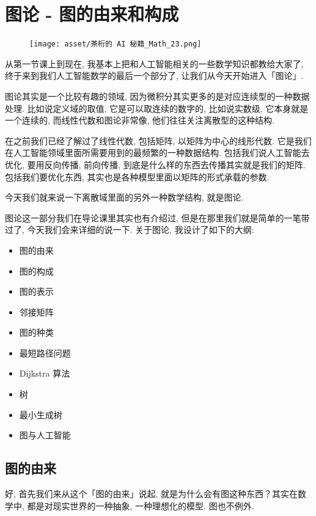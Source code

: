 \chapter{图论 - 图的由来和构成}

\begin{figure}[ht]
  \centering
  \texttt{[image: asset/茶桁的 AI 秘籍\_Math\_23.png]}
\end{figure}

\newpage

从第一节课上到现在, 我基本上把和人工智能相关的一些数学知识都教给大家了, 终于来到我们人工智能数学的最后一个部分了, 让我们从今天开始进入「图论」. 

图论其实是一个比较有趣的领域, 因为微积分其实更多的是对应连续型的一种数据处理. 比如说定义域的取值, 它是可以取连续的数字的, 比如说实数级, 它本身就是一个连续的, 而线性代数和图论非常像, 他们往往关注离散型的这种结构. 

在之前我们已经了解过了线性代数, 包括矩阵, 以矩阵为中心的线形代数. 它是我们在人工智能领域里面所需要用到的最频繁的一种数据结构. 包括我们说人工智能去优化, 要用反向传播, 前向传播, 到底是什么样的东西去传播其实就是我们的矩阵. 包括我们要优化东西, 其实也是各种模型里面以矩阵的形式承载的参数. 

今天我们就来说一下离散域里面的另外一种数学结构, 就是图论. 

图论这一部分我们在导论课里其实也有介绍过, 但是在那里我们就是简单的一笔带过了, 今天我们会来详细的说一下. 关于图论, 我设计了如下的大纲: 

\begin{itemize}
  \item 图的由来
  \item 图的构成
  \item 图的表示
  \item 邻接矩阵
  \item 图的种类
  \item 最短路径问题
  \item Dijkstra 算法
  \item 树
  \item 最小生成树
  \item 图与人工智能
\end{itemize}

\section{图的由来}

好, 首先我们来从这个「图的由来」说起, 就是为什么会有图这种东西？其实在数学中, 都是对现实世界的一种抽象, 一种理想化的模型. 图也不例外. 

